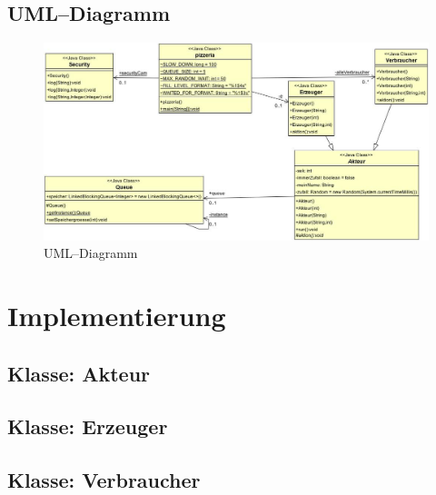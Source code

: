 \subsection{UML–Diagramm} %
\label{sub:uml_diagramm}
\begin{figure}[H]
\begin{center}
\includegraphics[width=\textwidth]{UML.jpg}
\caption{UML–Diagramm}
\label{fig:epk}
\end{center}
\end{figure}


\section{Implementierung} %
\label{sec:implementierung}

\subsection{Klasse: Akteur} %
\label{sub:klasse_akteur}


\subsection{Klasse: Erzeuger} %
\label{sub:klasse_erzeuger}


\subsection{Klasse: Verbraucher} %
\label{sub:klasse_verbraucher}


